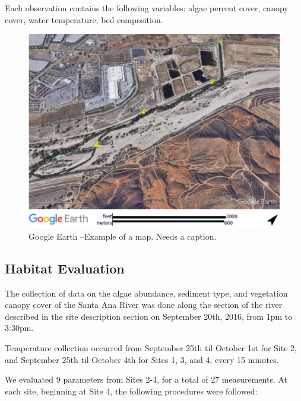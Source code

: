 \documentclass{article}\usepackage[]{graphicx}\usepackage[]{color}
\begin{document}
Each observation contains the following variables: algae percent cover, canopy cover, water temperature, bed composition.  


\begin{figure}[!ht]
\includegraphics[width=1.00\textwidth]{Figures/SiteMap}
\caption{Google Earth --Example of a map. Needs a caption.}
\label{SAR_Image}
\end{figure}

\subsection{Habitat Evaluation}

The collection of data on the algae abundance, sediment type, and vegetation canopy cover of the Santa Ana River was done along the section of the river described in the site description section on September 20th, 2016, from 1pm to 3:30pm.

Temperature collection occurred from September 25th til October 1st for Site 2, and September 25th til October 4th for Sites 1, 3, and 4, every 15 minutes.

We evaluated 9 parameters from Sites 2-4, for a total of 27 measurements. At each site, beginning at Site 4, the following procedures were followed: 
\end{document}
